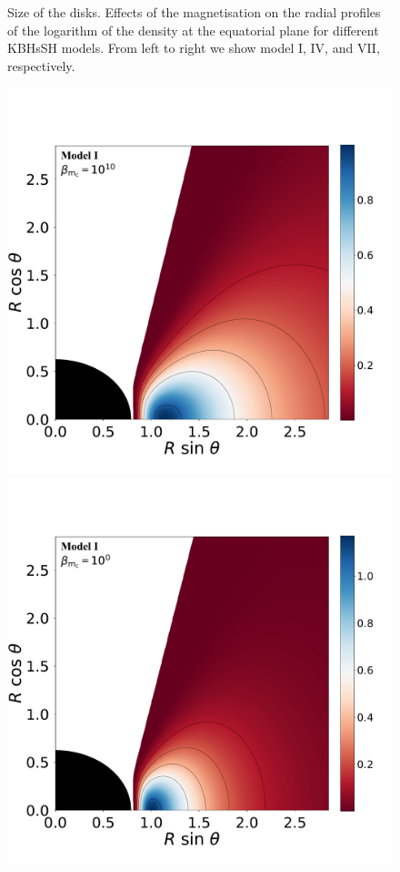 \documentclass[twocolumn,aps,showpacs,showkeys,prd,superscriptaddress,byrevtex, amsmath]{revtex4-1}
\begin{document}
\begin{figure}
\hspace{-0.6cm}
\caption{Size of the disks. Effects of the magnetisation on the radial profiles of the logarithm of the density at the equatorial plane for different KBHsSH models. From left to right we show model I, IV, and VII, respectively.}
\label{radial_profiles_HBH}
\end{figure}

\begin{figure}
\centering
\includegraphics[scale=0.14]{figures/fig3_I_10.pdf}
\hspace{-0.3cm}
\includegraphics[scale=0.14]{figures/fig3_I_1.pdf}

\end{figure}
\end{document}
